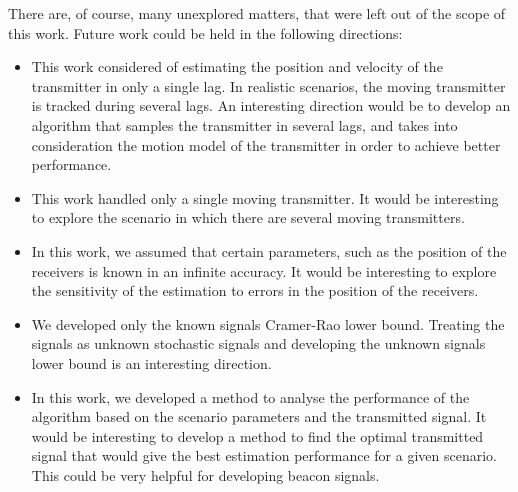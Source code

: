 There are, of course, many unexplored matters, that were left out of the scope of this work. Future work could be held in the following directions:
\begin{itemize}
\item This work considered of estimating the position and velocity of the transmitter in only a single lag. In realistic scenarios, the moving transmitter is tracked during several lags. An interesting direction would be to develop an algorithm that samples the transmitter in several lags, and takes into consideration the motion model of the transmitter in order to achieve better performance.
\item This work handled only a single moving transmitter. It would be interesting to explore the scenario in which there are several moving transmitters.
\item In this work, we assumed that certain parameters, such as the position of the receivers is known in an infinite accuracy. It would be interesting to explore the sensitivity of the estimation to errors in the position of the receivers.
\item We developed only the known signals Cramer-Rao lower bound. Treating the signals as unknown stochastic signals and developing the unknown signals lower bound is an interesting direction.
\item In this work, we developed a method to analyse the performance of the algorithm based on the scenario parameters and the transmitted signal. It would be interesting to develop a method to find the optimal transmitted signal that would give the best estimation performance for a given scenario. This could be very helpful for developing beacon signals.
\end{itemize}
